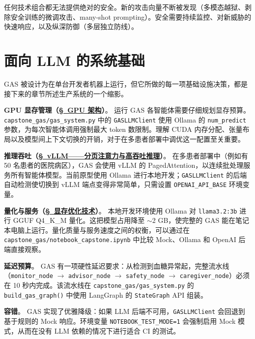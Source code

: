 \begin{warningbox}[安全永无完结]
任何技术组合都无法提供绝对的安全。新的攻击向量不断被发现（多模态越狱、剥除安全训练的微调攻击、many-shot prompting）。安全需要持续监控、对新威胁的快速响应，以及纵深防御（多层独立防线）。
\end{warningbox}

\chapter{面向 LLM 的系统基础}
\label{systems-foundations-for-llms}

\begin{keybox}
GAS 被设计为在单台开发者机器上运行，但它所做的每一项基础设施决策，都是接下来的章节所述生产系统的一个缩影。

\textbf{GPU 显存管理（\hyperref[gpu-architecture-from-silicon-to-llm-training]{\S~GPU 架构}）}。
运行 GAS 各智能体需要仔细规划显存预算。\texttt{capstone\_gas/gas\_system.py} 中的 \texttt{GASLLMClient} 使用 Ollama 的 \texttt{num\_predict} 参数，为每次智能体调用强制最大 token 数限制。理解 CUDA 内存分配、张量布局以及模型间上下文切换的开销，对于在多患者部署中调优这一配置至关重要。

\textbf{推理吞吐（\hyperref[vllm-pagedattention-and-high-throughput-inference]{\S~vLLM——分页注意力与高吞吐推理}）}。
在多患者部署中（例如有 50 名患者的医院病区），GAS 会使用 vLLM 的 PagedAttention，以连续批处理服务所有智能体模型。当前原型使用 Ollama 进行本地开发；\texttt{GASLLMClient} 的后端自动检测使切换到 vLLM 端点变得非常简单，只需设置 \texttt{OPENAI\_API\_BASE} 环境变量。

\textbf{量化与服务（\hyperref[memory-optimization-techniques]{\S~显存优化技术}）}。
本地开发环境使用 Ollama 对 \texttt{llama3.2:3b} 进行 GGUF Q4\_K\_M 量化。这把模型占用降至 $\sim$2 GB，使完整的 GAS 能在笔记本电脑上运行。量化质量与服务速度之间的权衡，可以通过在 \texttt{capstone\_gas/notebook\_capstone.ipynb} 中比较 Mock、Ollama 和 OpenAI 后端直接观察。

\textbf{延迟预算}。
GAS 有一项硬性延迟要求：从检测到血糖异常起，完整流水线（\texttt{monitor\_node} $\to$ \texttt{advisor\_node} $\to$ \texttt{safety\_node} $\to$ \texttt{caregiver\_node}）必须在 10 秒内完成。该流水线在 \texttt{capstone\_gas/gas\_system.py} 的 \texttt{build\_gas\_graph()} 中使用 LangGraph 的 \texttt{StateGraph} API 组装。

\textbf{容错}。
GAS 实现了优雅降级：如果 LLM 后端不可用，\texttt{GASLLMClient} 会回退到基于规则的 Mock 响应。环境变量 \texttt{NOTEBOOK\_TEST\_MODE=1} 会强制启用 Mock 模式，从而在没有 LLM 依赖的情况下进行适合 CI 的测试。
\end{keybox}

